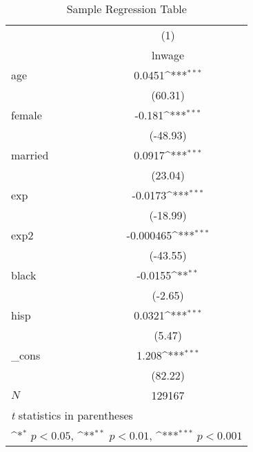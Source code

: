 \begin{table}[htbp]\centering
\def\sym#1{\ifmmode^{#1}\else\(^{#1}\)\fi}
\caption{Sample Regression Table \label{reg1}}
\begin{tabular}{l*{1}{c}}
\hline\hline
            &\multicolumn{1}{c}{(1)}\\
            &\multicolumn{1}{c}{lnwage}\\
\hline
age         &      0.0451\sym{***}\\
            &     (60.31)         \\
[1em]
female      &      -0.181\sym{***}\\
            &    (-48.93)         \\
[1em]
married     &      0.0917\sym{***}\\
            &     (23.04)         \\
[1em]
exp         &     -0.0173\sym{***}\\
            &    (-18.99)         \\
[1em]
exp2        &   -0.000465\sym{***}\\
            &    (-43.55)         \\
[1em]
black       &     -0.0155\sym{**} \\
            &     (-2.65)         \\
[1em]
hisp        &      0.0321\sym{***}\\
            &      (5.47)         \\
[1em]
\_cons      &       1.208\sym{***}\\
            &     (82.22)         \\
\hline
\(N\)       &      129167         \\
\hline\hline
\multicolumn{2}{l}{\footnotesize \textit{t} statistics in parentheses}\\
\multicolumn{2}{l}{\footnotesize \sym{*} \(p<0.05\), \sym{**} \(p<0.01\), \sym{***} \(p<0.001\)}\\
\end{tabular}
\end{table}
